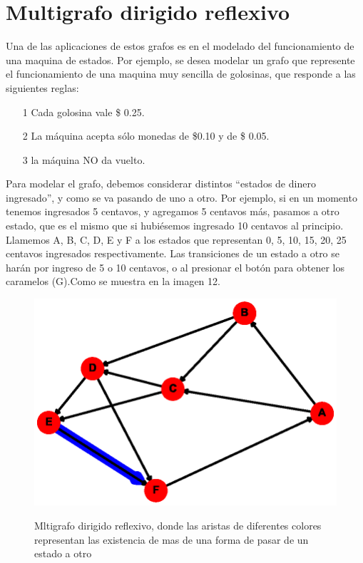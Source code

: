 \documentclass{article}
\begin{document}
\section{Multigrafo dirigido reflexivo}
Una de las aplicaciones de estos grafos es en el modelado del funcionamiento de una maquina de estados. 
Por ejemplo, se desea modelar un grafo que represente el funcionamiento de una maquina muy sencilla de golosinas, que responde a las siguientes reglas:
\begin{itemize}
\item[1] Cada golosina vale \$ 0.25.
\item[2] La máquina acepta sólo monedas de  \$0.10 y de \$ 0.05.
\item[3] la máquina NO da vuelto.
\end{itemize}
Para modelar el grafo, debemos considerar distintos “estados de dinero ingresado”, y como se va pasando de uno a otro. Por ejemplo, si en un momento tenemos ingresados 5 centavos, y agregamos 5 centavos más, pasamos a otro estado, que es el mismo que si hubiésemos ingresado 10 centavos al principio. Llamemos A, B, C, D, E y F a los estados que representan 0, 5, 10, 15, 20, 25 centavos ingresados respectivamente. Las transiciones de un estado a otro se harán por ingreso de 5 o 10 centavos, o al presionar el botón para obtener los caramelos (G).Como se muestra en la imagen 12. 
\begin{center}

\end{center}
\begin{figure}[h]
\begin{center}
\includegraphics[scale=0.7]{Graf12.eps}\\
\caption{Mltigrafo dirigido reflexivo, donde las aristas de diferentes colores representan las existencia de mas de una forma de pasar de un estado a otro}
\end{center}
\end{figure}



\end{document}
